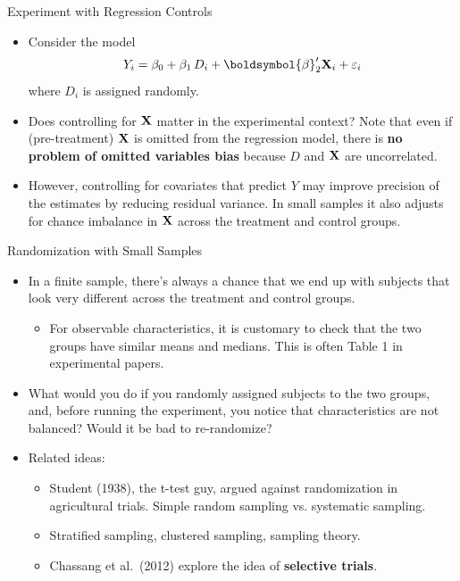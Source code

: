 \documentclass[aspectratio=169,11pt]{beamer}
\begin{document}
\begin{frame}{Experiment with Regression Controls}
\begin{itemize}
  \item Consider the model \[
  Y_{i}=\beta_{0}+\beta_{1}\, D_{i}+\boldsymbol{\beta}_2' {\bf X}_i + \varepsilon_{i}
  \]
  where $D_i$ is assigned randomly.

  \medskip
  \item Does controlling for ${\bf X}$ matter in the experimental context? Note that
  even if (pre-treatment) ${\bf X}$  is omitted from the regression model, there is {\bf no problem of
  omitted variables bias} because $D$ and ${\bf X}$ are uncorrelated.

  \medskip
  \item However, controlling for covariates that predict $Y$ may improve precision of the estimates
  by reducing residual variance. In small samples it also adjusts for chance imbalance in ${\bf X}$
  across the treatment and control groups.

\end{itemize}
\end{frame}

\begin{frame}{Randomization with Small Samples}
\begin{itemize}
  \item In a finite sample, there's always
  a chance that we end up with subjects that look very different
  across the treatment and control groups.
  \begin{itemize}
    \item For observable characteristics, it is customary to check that
    the two groups have similar means and medians. This is often
    Table 1 in experimental papers.
  \end{itemize}

  \smallskip
  \item What would you do if you randomly assigned subjects to the two groups,
  and, before running the experiment, you notice that characteristics are not
  balanced? Would it be bad to re-randomize?

  \smallskip
  \item Related ideas:
  \begin{itemize}
    \item Student (1938), the t-test guy, argued against randomization in agricultural trials.
    Simple random sampling vs. systematic sampling.
    \item Stratified sampling, clustered sampling, sampling theory.
    \item Chassang et al.\ (2012) explore the idea of {\bf selective trials}.
  \end{itemize}

\end{itemize}
\end{frame}
\end{document}
